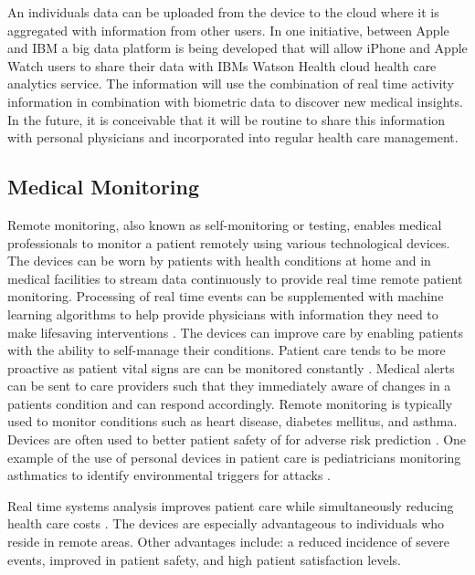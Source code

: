 \documentclass[sigconf]{acmart}
\begin{document}
An individuals data can be uploaded from the device to the cloud where it is aggregated with information from other users.  In one initiative, between Apple and IBM a big data platform is being developed that will allow iPhone and Apple Watch users to share their data with IBMs Watson Health cloud health care analytics service. The information will use the combination of real time activity information in combination with biometric data to discover new medical insights. In the future, it is conceivable that it will be routine to share this information with personal physicians and incorporated into regular health care management.

\subsection{Medical Monitoring} 

Remote monitoring, also known as self-monitoring or testing, enables medical professionals to monitor a patient remotely using various technological devices. The devices can be worn by patients with health conditions at home and in medical facilities to stream data continuously to provide real time remote patient monitoring.  Processing of real time events can be supplemented with machine learning algorithms to help provide physicians with information they need to make lifesaving interventions \cite{www-google-McDonald}.  The devices can improve care by enabling patients with the ability to self-manage their conditions. Patient care tends to be more proactive as patient vital signs are can be monitored constantly \cite{www-google-McDonald}. Medical alerts can be sent to care providers such that they immediately aware of changes in a patients condition and can respond accordingly.  Remote monitoring is typically used to monitor conditions such as heart disease, diabetes mellitus, and asthma. Devices are often used to better patient safety of for adverse risk prediction \cite{www-google-McDonald}.  One example of the use of personal devices in patient care is pediatricians monitoring asthmatics to identify environmental triggers for attacks \cite{www-google-CIO}. 

Real time systems analysis improves patient care while simultaneously reducing health care costs \cite{www-google-christian}.  The devices are especially advantageous to individuals who reside in remote areas. Other advantages include: a reduced incidence of severe events, improved in patient safety, and high patient satisfaction levels.
 
\end{document}
